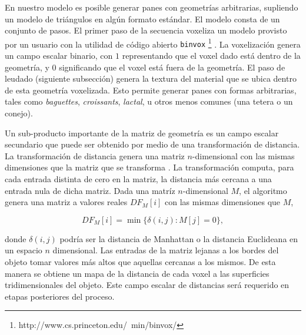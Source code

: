 En nuestro modelo es posible generar panes con geometrías arbitrarias, supliendo un modelo de triángulos en algún formato estándar.
El modelo consta de un conjunto de pasos. El primer paso de la secuencia voxeliza un modelo provisto por un usuario con la utilidad de código abierto {\tt binvox} \footnote{http://www.cs.princeton.edu/~min/binvox/} \cite{Nooruddin2003}.
La voxelización genera un campo escalar binario, con $1$ representando que el voxel dado está dentro de la geometría, y $0$ significando que el voxel está fuera de la geometría.
El paso de leudado (siguiente subsección) genera la textura del material que se ubica dentro de esta geometría voxelizada.
Esto permite generar panes con formas arbitrarias, tales como {\em baguettes}, {\em croissants}, {\em lactal}, u otros menos comunes (una tetera o un conejo).

Un sub-producto importante de la matriz de geometría es un campo escalar secundario que puede ser obtenido por medio de una transformación de distancia.
La transformación de distancia genera una matriz $n$-dimensional con las mismas dimensiones que la matriz que se transforma \cite{osh03}.
La transformación computa, para cada entrada distinta de cero en la matriz, la distancia más cercana a una entrada nula de dicha matriz.
Dada una matríz $n$-dimensional $M$, el algoritmo genera una matriz a valores reales $DF_{M}[i]$ con las mismas dimensiones que $M$,


$$  DF_{M}[i] = \min \bigg\{ \delta(i,j): M[j] = 0 \bigg\},$$


\noindent
donde $\delta(i,j)$ podría ser la distancia de Manhattan o la distancia Euclideana en un espacio $n$ dimensional.
Las entradas de la matriz lejanas a los bordes del objeto tomar valores más altos que aquellas cercanas a los mismos.
De esta manera se obtiene un mapa de la distancia de cada voxel a las superficies tridimensionales del objeto.
Este campo escalar de distancias será requerido en etapas posteriores del proceso.


